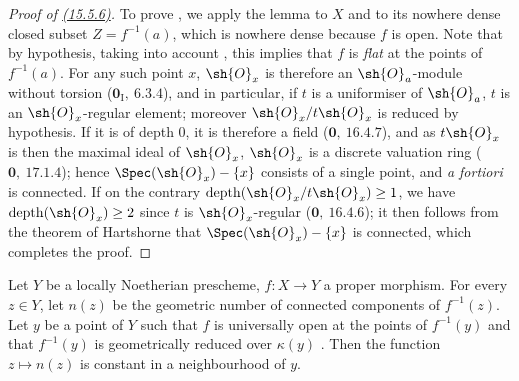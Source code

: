\begin{proof}[Proof of {\rm {\hyperlink{ega4.c04.lem.15-5-6}{(15.5.6)}}}]
To prove , we apply the lemma  to $X$ and to its nowhere dense closed subset $Z=f^{-1}(a)$, which is nowhere dense because $f$ is open.
Note that by hypothesis, taking into account , this implies that $f$ is \emph{flat} at the points of $f^{-1}(a)$.
For any such point $x$, $\sh{O}_x$ is therefore an $\sh{O}_a$-module without torsion ($\mathbf{0}_{\mathrm{I}},~6.3.4$), and in particular, if $t$ is a uniformiser of $\sh{O}_a$, $t$ is an $\sh{O}_x$-regular element; moreover $\sh{O}_x/t\sh{O}_x$ is reduced by hypothesis. If it is of depth $0$, it is therefore a field ($\mathbf{0},~16.4.7$), and as $t\sh{O}_x$ is then the maximal ideal of $\sh{O}_x$, $\sh{O}_x$ is a discrete valuation ring ($\mathbf{0},~17.1.4$); hence $\Spec(\sh{O}_x)-\{x\}$ consists of a single point, and \emph{a fortiori} is connected.
If on the contrary $\operatorname{depth}(\sh{O}_x/t\sh{O}_x)\geq 1$, we have $\operatorname{depth}(\sh{O}_x)\geq 2$ since $t$ is $\sh{O}_x$-regular ($\mathbf{0},~16.4.6$); it then follows from the theorem of Hartshorne  that $\Spec(\sh{O}_x)-\{x\}$ is connected, which completes the proof.
\end{proof}

\begin{proposition}[15.5.7]
\label{IV.15.5.7}
Let $Y$ be a locally Noetherian prescheme, $f:X\to Y$ a proper morphism.
For every $z\in Y$, let $n(z)$ be the geometric number of connected components of $f^{-1}(z)$.
Let $y$ be a point of $Y$ such that $f$ is universally open at the points of $f^{-1}(y)$ and that $f^{-1}(y)$ is geometrically reduced over $\kappa(y)$ .
Then the function $z\mapsto n(z)$ is constant in a neighbourhood of $y$.
\end{proposition}

